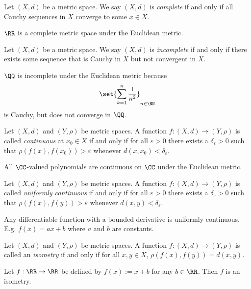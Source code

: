 \begin{definition*}
	Let $(X,d)$ be a metric space.
	We say $(X,d)$ is \textit{complete} if and only if all Cauchy sequences in $X$ converge to some $x\in X$.
\end{definition*}
\begin{example*}
	$\RR$ is a complete metric space under the Euclidean metric.
\end{example*}

\begin{definition*}
	Let $(X,d)$ be a metric space.
	We say $(X,d)$ is \textit{incomplete} if and only if there exists some sequence that is Cauchy in $X$ but not convergent in $X$.
\end{definition*}
\begin{example*}
	$\QQ$ is incomplete under the Euclidean metric because
	\[
		\set{\sum_{k=1}^n \frac{1}{n^2}}_{n\in\NN}
	\]
	is Cauchy, but does not converge in $\QQ$.
\end{example*}

\begin{definition*}
	Let $(X,d)$ and $(Y,\rho)$ be metric spaces.
	A function $f:(X,d)\rightarrow(Y,\rho)$ is called \textit{continuous} at $x_0\in X$ if and only if for all $\varepsilon>0$ there exists a $\delta_\varepsilon>0$ such that $\rho(f(x),f(x_0))>\varepsilon$ whenever $d(x,x_0)<\delta_\varepsilon$.
\end{definition*}
\begin{example*}
	All $\CC$-valued polynomials are continuous on $\CC$ under the Euclidean metric.
\end{example*}

\begin{definition*}
	Let $(X,d)$ and $(Y,\rho)$ be metric spaces.
	A function $f:(X,d)\rightarrow(Y,\rho)$ is called \textit{uniformly continuous} if and only if for all $\varepsilon>0$ there exists a $\delta_\varepsilon>0$ such that $\rho(f(x),f(y))>\varepsilon$ whenever $d(x,y)<\delta_\varepsilon$.
\end{definition*}
\begin{example*}
	Any differentiable function with a bounded derivative is uniformly continuous.
	E.g. $f(x)=ax+b$ where $a$ and $b$ are constants.
\end{example*}

\begin{definition*}
	Let $(X,d)$ and $(Y,\rho)$ be metric spaces.
	A function $f:(X,d)\rightarrow(Y,\rho)$ is called an \textit{isometry} if and only if for all $x,y\in X$, $\rho(f(x),f(y))=d(x,y)$.
\end{definition*}
\begin{example*}
	Let $f:\RR\rightarrow\RR$ be defined by $f(x):=x+b$ for any $b\in\RR$.
	Then $f$ is an isometry.
\end{example*}

